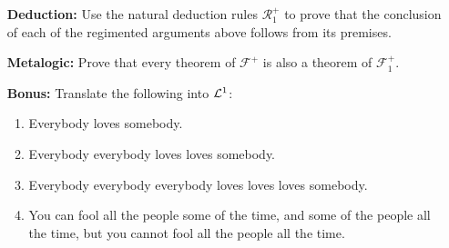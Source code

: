 \documentclass[a4paper, 11pt]{article} %
\begin{document}
\begin{enumerate}[leftmargin=1.2in,labelsep=.15in]
\begin{enumerate}[label=(\arabic*)]
	\end{enumerate}
\item[\bf Deduction:] Use the natural deduction rules $\mathcal{R}_1^+$ to prove that the conclusion of each of the regimented arguments above follows from its premises.
\item[\bf Metalogic:] Prove that every theorem of $\mathcal{F}^+$ is also a theorem of $\mathcal{F}^+_1$.
\item[\bf Bonus:] Translate the following into $\mathcal{L}^1$:
	\begin{enumerate}[label=(\arabic*)]\small
	\item Everybody loves somebody.
	\item Everybody everybody loves loves somebody.
	\item Everybody everybody everybody loves loves loves somebody.
	\item You can fool all the people some of the time, and some of the people all the time, but you cannot fool all the people all the time.
	\end{enumerate}
\end{enumerate}
\end{document}
